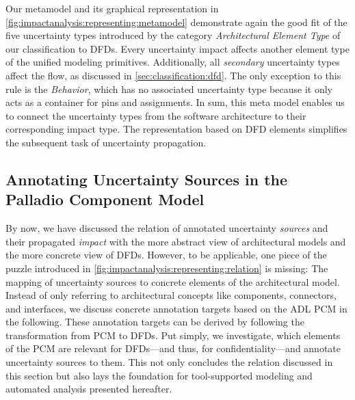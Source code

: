 Our metamodel and its graphical representation in \autoref{fig:impactanalysis:representing:metamodel} demonstrate again the good fit of the five uncertainty types introduced by the category \emph{Architectural Element Type} of our classification to \acp{DFD}.
Every uncertainty impact affects another element type of the unified modeling primitives.
Additionally, all \emph{secondary} uncertainty types affect the flow, as discussed in \autoref{sec:classification:dfd}.
The only exception to this rule is the \emph{Behavior}, which has no associated uncertainty type because it only acts as a container for pins and assignments.
In sum, this meta model enables us to connect the uncertainty types from the software architecture to their corresponding impact type.
The representation based on \ac{DFD} elements simplifies the subsequent task of uncertainty propagation.



\subsection{Annotating Uncertainty Sources in the Palladio Component Model}

By now, we have discussed the relation of annotated uncertainty \emph{sources} and their propagated \emph{impact} with the more abstract view of architectural models and the more concrete view of \acp{DFD}.
However, to be applicable, one piece of the puzzle introduced in \autoref{fig:impactanalysis:representing:relation} is missing: The mapping of uncertainty sources to concrete elements of the architectural model.
Instead of only referring to architectural concepts like components, connectors, and interfaces, we discuss concrete annotation targets based on the \ac{ADL} \ac{PCM} \cite{reussner_modeling_2016} in the following.
These annotation targets can be derived by following the transformation \cite{seifermann_architectural_2022} from \ac{PCM} to \acp{DFD}.
Put simply, we investigate, which elements of the \ac{PCM} are relevant for \acp{DFD}---and thus, for confidentiality---and annotate uncertainty sources to them.
This not only concludes the relation discussed in this section but also lays the foundation for tool-supported modeling and automated analysis presented hereafter.

